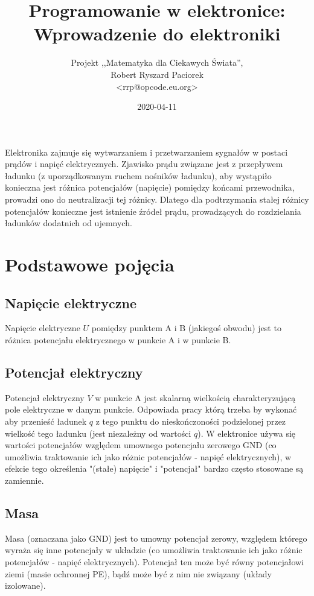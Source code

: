 \documentclass{pdfBooklets}
\title{Programowanie w elektronice: Wprowadzenie do elektroniki}
\author{%
	Projekt ,,Matematyka dla Ciekawych Świata'',\\
	Robert Ryszard Paciorek\\\normalsize\ttfamily <rrp@opcode.eu.org>
}
\date  {2020-04-11}
\begin{document}
\maketitle

Elektronika zajmuje się wytwarzaniem i przetwarzaniem sygnałów w postaci prądów i napięć elektrycznych.
Zjawisko prądu związane jest z przepływem ładunku (z uporządkowanym ruchem nośników ładunku), aby wystąpiło konieczna jest różnica potencjałów (napięcie) pomiędzy końcami przewodnika, prowadzi ono do neutralizacji tej różnicy.
Dlatego dla podtrzymania stałej różnicy potencjałów konieczne jest istnienie źródeł prądu, prowadzących do rozdzielania ładunków dodatnich od ujemnych.

\section{Podstawowe pojęcia}

\subsection{Napięcie elektryczne}
    Napięcie elektryczne $U$ pomiędzy punktem A i B (jakiegoś obwodu)
    jest to różnica potencjału elektrycznego w punkcie A i w punkcie B.
\subsection{Potencjał elektryczny}
    Potencjał elektryczny $V$ w punkcie A
    jest skalarną wielkością charakteryzującą pole elektryczne w danym punkcie. Odpowiada pracy którą trzeba by wykonać aby przenieść ładunek $q$ z tego punktu do nieskończoności podzielonej przez wielkość tego ładunku (jest niezależny od wartości $q$).
    W elektronice używa się wartości potencjałów względem umownego potencjału zerowego GND (co umożliwia traktowanie ich jako różnic potencjałów - napięć elektrycznych), w efekcie tego określenia "(stałe) napięcie" i "potencjał" bardzo często stosowane są zamiennie. 
\subsection{Masa}
   Masa (oznaczana jako GND) jest to
   umowny potencjał zerowy, względem którego wyraża się inne potencjały w układzie (co umożliwia traktowanie ich jako różnic potencjałów - napięć elektrycznych). Potencjał ten może być równy potencjałowi ziemi (masie ochronnej PE), bądź może być z nim nie związany (układy izolowane).
\end{document}
